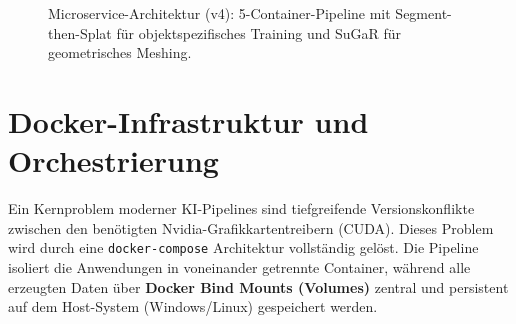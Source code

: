 \documentclass[12pt,a4paper]{article}
\begin{document}
\begin{figure}[h!]
{
    }
    \caption{Microservice-Architektur (v4): 5-Container-Pipeline mit Segment-then-Splat für objektspezifisches Training und SuGaR für geometrisches Meshing.}
\end{figure}

\section{Docker-Infrastruktur und Orchestrierung}
Ein Kernproblem moderner KI-Pipelines sind tiefgreifende Versionskonflikte zwischen den benötigten Nvidia-Grafikkartentreibern (CUDA). Dieses Problem wird durch eine \texttt{docker-compose} Architektur vollständig gelöst. Die Pipeline isoliert die Anwendungen in voneinander getrennte Container, während alle erzeugten Daten über \textbf{Docker Bind Mounts (Volumes)} zentral und persistent auf dem Host-System (Windows/Linux) gespeichert werden.
\end{document}
